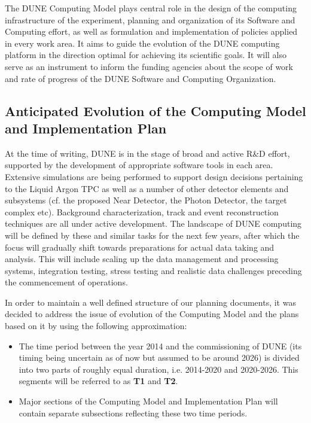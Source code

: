 The DUNE Computing Model plays central role in the design of the computing infrastructure of the experiment, planning and organization of its 
Software and Computing effort, as well as formulation and implementation of policies applied in every work area. It aims to guide 
the evolution of the DUNE computing platform in the direction optimal for achieving its scientific goals. It will also serve
as an instrument to inform the funding agencies about the scope of work and rate of progress of the DUNE Software and 
Computing Organization.

\subsection{Anticipated Evolution of the Computing Model and Implementation Plan}

At the time of writing, DUNE is in the stage of broad and active R\&D effort, supported by the development of appropriate 
software tools in each area. Extensive simulations are being performed to support design decisions pertaining to the Liquid 
Argon TPC as well as a number of other detector elements and subsystems (cf. the proposed Near Detector, the Photon Detector, 
the target complex etc). Background characterization, track and event reconstruction techniques are all under active development. 
The landscape of DUNE computing will be defined by these and similar tasks for  the next few years, after which the focus will 
gradually shift towards preparations for actual data taking and analysis. 
This will include scaling up the data management and processing systems, integration testing, 
stress testing and  realistic data challenges preceding the commencement of operations.

In order to maintain a well defined structure of our planning documents, it was decided to address the issue of evolution of the Computing Model 
and the plans based on it by using the following approximation:

\begin{itemize}

\item The time period between the year 2014 and the commissioning of DUNE (its timing being uncertain as of now but assumed to be around 2026) is divided into two parts of roughly equal duration, i.e. 2014-2020 and 2020-2026. This segments will be referred to as \textbf{T1} and \textbf{T2}.


\item Major sections of the Computing Model and Implementation Plan will contain separate subsections reflecting these two time periods.

\end{itemize}
 

